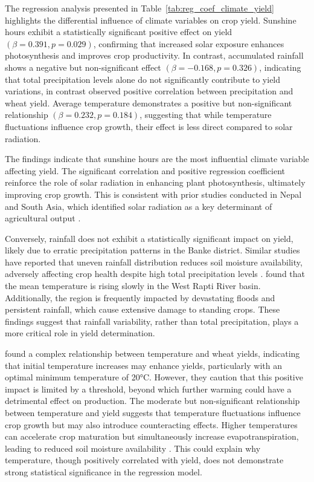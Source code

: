 The regression analysis presented in Table~\ref{tab:reg_coef_climate_yield} highlights the differential influence of climate variables on crop yield. Sunshine hours exhibit a statistically significant positive effect on yield $(\beta = 0.391, p = 0.029)$, confirming that increased solar exposure enhances photosynthesis and improves crop productivity. In contrast, accumulated rainfall shows a negative but non-significant effect $(\beta = -0.168, p = 0.326)$, indicating that total precipitation levels alone do not significantly contribute to yield variations, in contrast \citet{thapa-parajuliImpactClimateChange2016} observed positive correlation between precipitation and wheat yield. Average temperature demonstrates a positive but non-significant relationship $(\beta = 0.232, p = 0.184)$, suggesting that while temperature fluctuations influence crop growth, their effect is less direct compared to solar radiation.

The findings indicate that sunshine hours are the most influential climate variable affecting yield. The significant correlation and positive regression coefficient reinforce the role of solar radiation in enhancing plant photosynthesis, ultimately improving crop growth. This is consistent with prior studies conducted in Nepal and South Asia, which identified solar radiation as a key determinant of agricultural output \citep{thapa-parajuliImpactClimateChange2016}.

Conversely, rainfall does not exhibit a statistically significant impact on yield, likely due to erratic precipitation patterns in the Banke district. Similar studies have reported that uneven rainfall distribution reduces soil moisture availability, adversely affecting crop health despite high total precipitation levels \citep{regmiCropYieldResponse2019}. \citet{devkotaClimateChangeTrends2014} found that the mean temperature is rising slowly in the West Rapti River basin. Additionally, the region is frequently impacted by devastating floods and persistent rainfall, which cause extensive damage to standing crops. These findings suggest that rainfall variability, rather than total precipitation, plays a more critical role in yield determination.

\citet{thapa-parajuliImpactClimateChange2016} found a complex relationship between temperature and wheat yields, indicating that initial temperature increases may enhance yields, particularly with an optimal minimum temperature of 20°C. However, they caution that this positive impact is limited by a threshold, beyond which further warming could have a detrimental effect on production. 
The moderate but non-significant relationship between temperature and yield suggests that temperature fluctuations influence crop growth but may also introduce counteracting effects. Higher temperatures can accelerate crop maturation but simultaneously increase evapotranspiration, leading to reduced soil moisture availability \citep{shresthaFarmersPerceptionClimate2022}. This could explain why temperature, though positively correlated with yield, does not demonstrate strong statistical significance in the regression model.

